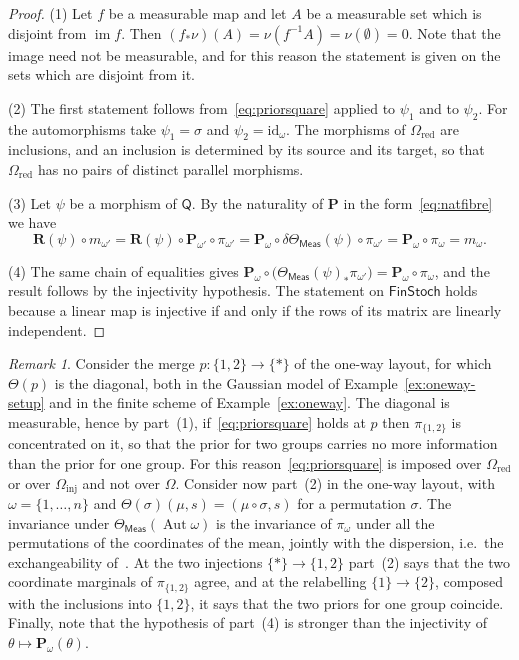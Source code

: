 \documentclass[11pt,a4paper]{article}
\theoremstyle{plain}
\theoremstyle{definition}
\theoremstyle{remark}
\newtheorem{remark}[theorem]{Remark}
\newcommand{\cat}[1]{\mathsf{#1}}
\newcommand{\catO}{\cat{\Omega}}
\newcommand{\Meas}{\cat{Meas}}
\newcommand{\FinStoch}{\cat{FinStoch}}
\newcommand{\id}{\mathrm{id}}
\newcommand{\del}{\delta}
\begin{document}
\begin{proof}
(1) Let $f$ be a measurable map and let $A$ be a measurable set which is
disjoint from $\operatorname{im} f$. Then
$(f_{*}\nu)(A) = \nu(f^{-1}A) = \nu(\emptyset) = 0$. Note that the image need
not be measurable, and for this reason the statement is given on the sets
which are disjoint from it.

(2) The first statement follows from~\eqref{eq:priorsquare} applied to
$\psi_1$ and to $\psi_2$. For the automorphisms take $\psi_1 = \sigma$ and
$\psi_2 = \id_{\omega}$. The morphisms of $\catO_{\mathrm{red}}$ are
inclusions, and an inclusion is determined by its source and its target, so
that $\catO_{\mathrm{red}}$ has no pairs of distinct parallel morphisms.

(3) Let $\psi$ be a morphism of $\cat{Q}$. By the naturality of $\mathbf P$ in
the form~\eqref{eq:natfibre} we have
\[
\mathbf{R}(\psi) \circ m_{\omega'} =
\mathbf{R}(\psi)\circ\mathbf P_{\omega'}\circ\pi_{\omega'} =
\mathbf P_{\omega}\circ\del\Theta_\Meas(\psi)\circ\pi_{\omega'} =
\mathbf P_{\omega}\circ\pi_{\omega} = m_{\omega}.
\]

(4) The same chain of equalities gives
$\mathbf P_{\omega}\circ\bigl(\Theta_\Meas(\psi)_{*}\pi_{\omega'}\bigr) =
\mathbf P_{\omega}\circ\pi_{\omega}$, and the result follows by the injectivity
hypothesis. The statement on $\FinStoch$ holds because a linear map is
injective if and only if the rows of its matrix are linearly independent.
\end{proof}

\begin{remark}\label{rem:coherence}
Consider the merge $p \colon \{1,2\} \to \{*\}$ of the one-way layout, for
which $\Theta(p)$ is the diagonal, both in the Gaussian model of
Example~\ref{ex:oneway-setup} and in the finite scheme of
Example~\ref{ex:oneway}. The diagonal is measurable, hence by part~(1),
if~\eqref{eq:priorsquare} holds at $p$ then $\pi_{\{1,2\}}$ is concentrated
on it, so that the prior for two groups carries no more information than the
prior for one group. For this reason~\eqref{eq:priorsquare} is imposed over
$\catO_{\mathrm{red}}$ or over $\catO_{\mathrm{inj}}$ and not over $\catO$.
Consider now part~(2) in the one-way layout, with $\omega = \{1,\dots,n\}$ and
$\Theta(\sigma)(\mu,s) = (\mu\circ\sigma, s)$ for a permutation $\sigma$. The
invariance under $\Theta_\Meas(\operatorname{Aut}\omega)$ is the invariance of
$\pi_{\omega}$ under all the permutations of the coordinates of the mean,
jointly with the dispersion, i.e.\ the exchangeability
of~\cite[Def.~4.1]{fritz_definetti_2021}. At the two injections
$\{*\} \to \{1,2\}$ part~(2) says that the two coordinate marginals of
$\pi_{\{1,2\}}$ agree, and at the relabelling $\{1\} \to \{2\}$, composed with
the inclusions into $\{1,2\}$, it says that the two priors for one group
coincide. Finally, note that the hypothesis of part~(4) is stronger than the
injectivity of $\theta \mapsto \mathbf P_{\omega}(\theta)$.
\end{remark}
\end{document}
